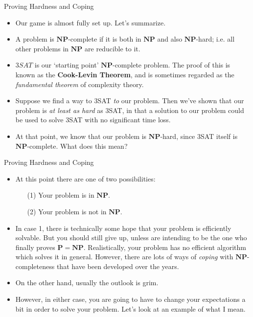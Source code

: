 \documentclass{beamer}
\begin{document}
\begin{frame}{Proving Hardness and Coping}
    \begin{itemize}
        \item Our game is almost fully set up. Let's summarize. \pause
        \item A problem is $\mathbf{NP}$-complete if it is both in $\mathbf{NP}$ and also $\mathbf{NP}$-hard; i.e. all other problems in $\mathbf{NP}$ are reducible to it. 
        \item $3SAT$ is our `starting point' $\mathbf{NP}$-complete problem. The proof of this is known as the \textbf{Cook-Levin Theorem}, and is sometimes regarded as the \emph{fundamental theorem} of complexity theory.
        \item Suppose we find a way to 3SAT \emph{to} our problem. Then we've shown that our problem is \emph{at least as hard} as 3SAT, in that a solution to our problem could be used to solve 3SAT with no significant time loss.
        \item At that point, we know that our problem is $\mathbf{NP}$-hard, since 3SAT itself is $\mathbf{NP}$-complete. What does this mean?
    \end{itemize}
\end{frame}

\begin{frame}{Proving Hardness and Coping}
    \begin{itemize}
        \item At this point there are one of two possibilities:
        \begin{itemize}
            \item[(1)] Your problem is in $\mathbf{NP}$.
            \item[(2)] Your problem is not in $\mathbf{NP}$.
        \end{itemize}
        \item In case 1, there is technically some hope that your problem is efficiently solvable. But you should still give up, unless are intending to be the one who finally proves $\mathbf{P} = \mathbf{NP}$. Realistically, your problem has no efficient algorithm which solves it in general. However, there are lots of ways of \emph{coping} with $\mathbf{NP}$-completeness that have been developed over the years.
        \item On the other hand, usually the outlook is grim.
        \item However, in either case, you are going to have to change your expectations a bit in order to solve your problem. Let's look at an example of what I mean.
    \end{itemize}
\end{frame}
\end{document}
